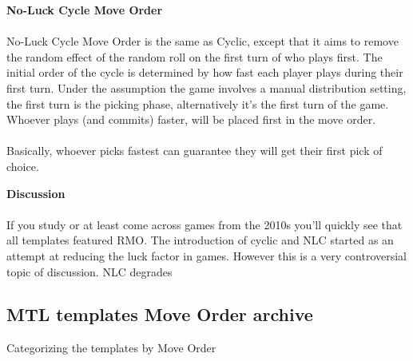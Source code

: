 \textbf{No-Luck Cycle Move Order} \label{noluck_cycle}
\\
\\
No-Luck Cycle Move Order is the same as Cyclic, except that it aims to remove the random effect of the random roll on the first turn of who plays first. The initial order of the cycle is determined by how fast each player plays during their first turn. Under the assumption the game involves a manual distribution setting, the first turn is the picking phase, alternatively it's the first turn of the game. Whoever plays (and commits) faster, will be placed first in the move order.
\\
\\
Basically, whoever picks fastest can guarantee they will get their first pick of choice. 

\textbf{Discussion}
\\
\\
If you study or at least come across games from the 2010s you'll quickly see that all templates featured RMO. The introduction of cyclic and NLC started as an attempt at reducing the luck factor in games. However this is a very controversial topic of discussion. NLC degrades
\subsection{MTL templates Move Order archive}

Categorizing the templates by Move Order


\footnotesize


